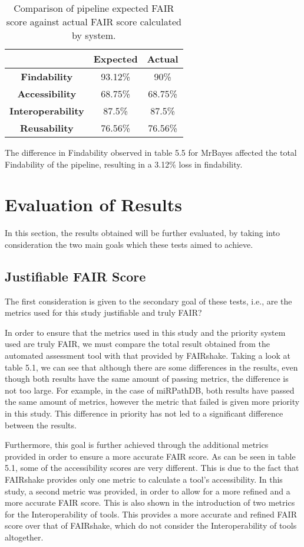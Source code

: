 \documentclass{cisfyp}
\begin{document}
\begin{table}[h]
{\renewcommand{\arraystretch}{1.5}%
\begin{tabular}{|c|c|c|}
\hline
 & \textbf{Expected} & \textbf{Actual} \\ \hline
\textbf{Findability} & 93.12\% & 90\% \\ \hline
\textbf{Accessibility} & 68.75\% & 68.75\% \\ \hline
\textbf{Interoperability} & 87.5\% & 87.5\% \\ \hline
\textbf{Reusability} & 76.56\% & 76.56\% \\ \hline
\end{tabular}%
}
\caption{Comparison of pipeline expected FAIR score against actual FAIR score calculated by system.}
\label{tab:my-table}
\end{table}

The difference in Findability observed in table 5.5 for MrBayes affected the total Findability of the pipeline, resulting in a 3.12\% loss in findability. \pagebreak

\section{Evaluation of Results}
In this section, the results obtained will be further evaluated, by taking into consideration the two main goals which these tests aimed to achieve.

\subsection{Justifiable FAIR Score}
The first consideration is given to the secondary goal of these tests, i.e., are the metrics used for this study justifiable and truly FAIR?

In order to ensure that the metrics used in this study and the priority system used are truly FAIR, we must compare the total result obtained from the automated assessment tool with that provided by FAIRshake. Taking a look at table 5.1, we can see that although there are some differences in the results, even though both results have the same amount of passing metrics, the difference is not too large. For example, in the case of miRPathDB, both results have passed the same amount of metrics, however the metric that failed is given more priority in this study. This difference in priority has not led to a significant difference between the results.

Furthermore, this goal is further achieved through the additional metrics provided in order to ensure a more accurate FAIR score. As can be seen in table 5.1, some of the accessibility scores are very different. This is due to the fact that FAIRshake provides only one metric to calculate a tool's accessibility. In this study, a second metric was provided, in order to allow for a more refined and a more accurate FAIR score. This is also shown in the introduction of two metrics for the Interoperability of tools. This provides a more accurate and refined FAIR score over that of FAIRshake, which do not consider the Interoperability of tools altogether.
\end{document}
